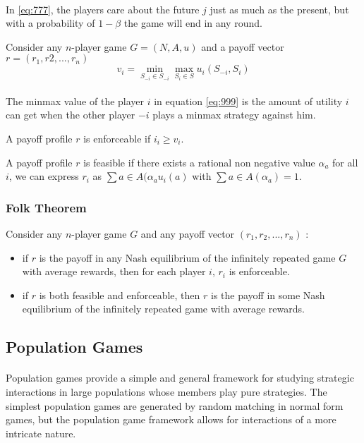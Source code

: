 \paragraph{}In \ref{eq:777}, the players care about the future $j$ just as much as the present, but with a probability of $1 - \beta$ the game will end in any round.
\begin{mydef}\label{def:def888}
Consider any $n$-player game $G = (N,A,u)$ and a payoff vector $r = (r_1, r2, ..., r_n)$
 \begin{equation}\label{eq:999}
	v_i = \min_{S_{-i} \in S_{-i}} \max_{S_i \in S} u_i (S_{-i}, S_i)
\end{equation}
\end{mydef}
\paragraph{} The minmax value of the player $i$ in equation \ref{eq:999} is the amount of utility $i$ can get when the other player $-i$ plays a minmax strategy against him.
\begin{mydef}[Enforceability]\label{def:def100}
A payoff profile $r$ is enforceable if $i_i \geq v_i$.
\end{mydef}
\begin{mydef}[Feasibility]\label{def:def100}
A payoff profile $r$ is feasible if there exists a rational non negative value $\alpha_a$ for all $i$, we can express $r_i$ as $\sum{a \in A}(\alpha_a u_i(a)$ with $\sum{a \in A}(\alpha_a) = 1$.
\end{mydef}
\subsubsection{Folk Theorem}
Consider any $n$-player game $G$ and any payoff vector $(r_1, r_2, ...,r_n) $ :
\begin{itemize}
\item if $r$ is the payoff in any Nash equilibrium of the infinitely repeated game $G$ with average rewards, then for each player $i$,  $r_i$ is enforceable.
\item if $r$ is both feasible and enforceable, then $r$ is the payoff in some Nash equilibrium of the infinitely repeated game with average rewards.
\end{itemize}
\subsection{Population Games}
\paragraph{}Population games provide a simple and general framework for studying strategic interactions in large populations whose members play pure strategies. The simplest population games are generated by random matching in normal form games, but the population game framework allows for interactions of a more intricate nature.
